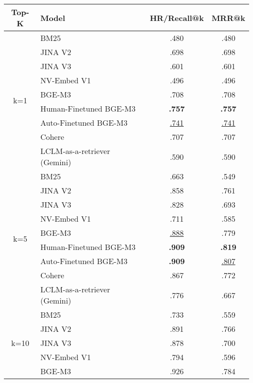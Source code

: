 \begin{table}[!ht]
\centering
\small
\begin{tabular}{@{}clcc@{}}
\toprule
\textbf{Top-K} & \textbf{Model} & \textbf{HR/Recall@k} & \textbf{MRR@k} \\ \midrule
\multirow{9}{*}{k=1} 
  & BM25                   & .480           & .480 \\
  & JINA V2                & .698           & .698 \\
  & JINA V3                & .601           & .601 \\
  & NV-Embed V1            & .496           & .496 \\
  & BGE-M3                 & .708           & .708 \\
  & Human-Finetuned BGE-M3 & \textbf{.757}  & \textbf{.757} \\
  & Auto-Finetuned BGE-M3  & \underline{.741} & \underline{.741} \\
  & Cohere                 & .707           & .707 \\
  & LCLM-as-a-retriever (Gemini)                   & .590           & .590 \\ \midrule
\multirow{9}{*}{k=5} 
  & BM25                   & .663           & .549 \\
  & JINA V2                & .858           & .761 \\
  & JINA V3                & .828           & .693 \\
  & NV-Embed V1            & .711           & .585 \\
  & BGE-M3                 & \underline{.888} & .779 \\
  & Human-Finetuned BGE-M3 & \textbf{.909}  & \textbf{.819} \\
  & Auto-Finetuned BGE-M3  & \textbf{.909}  & \underline{.807} \\
  & Cohere                 & .867           & .772 \\
  & LCLM-as-a-retriever (Gemini)                   & .776           & .667 \\ \midrule
\multirow{9}{*}{k=10} 
  & BM25                   & .733           & .559 \\
  & JINA V2                & .891           & .766 \\
  & JINA V3                & .878           & .700 \\
  & NV-Embed V1            & .794           & .596 \\
  & BGE-M3                 & .926           & .784 \\

\end{tabular}
\end{table}
